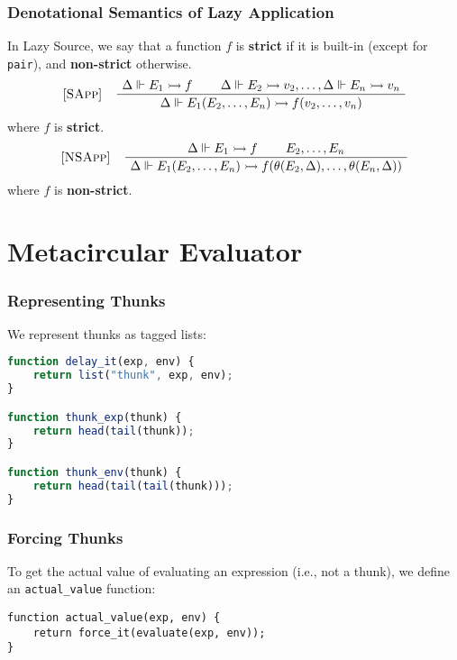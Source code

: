 \documentclass[12pt]{beamer}
\makeatletter
\newenvironment{boxedprooftree}[1][c]
 {\begin{tabular}[#1]{@{}c@{}}}
 {\DisplayProof\end{tabular}}
\makeatother
\begin{document}
\begin{frame}
\frametitle{Denotational Semantics of Lazy Application}
In Lazy Source, we say that a function $f$ is \textbf{strict} if it is built-in (except for \texttt{pair}), and \textbf{non-strict} otherwise.\pause
\[
\begin{tabular}{@{} l c @{}}
[\textsc{SApp}] &
  \begin{boxedprooftree}
  \AxiomC{$\Delta\Vdash E_1\rightarrowtail f$}
  \AxiomC{$\Delta\Vdash E_2\rightarrowtail v_2,\ldots,\Delta\Vdash E_n\rightarrowtail v_n$}
  \BinaryInfC{$\Delta\Vdash E_1(E_2,\ldots,E_n)\rightarrowtail f(v_2,\ldots,v_n)$}
  \end{boxedprooftree}
\end{tabular}
\]
where $f$ is \textbf{strict}.\pause
\[
\begin{tabular}{@{} l c @{}}
[\textsc{NSApp}] &
  \begin{boxedprooftree}
  \AxiomC{$\Delta\Vdash E_1\rightarrowtail f$}
  \AxiomC{$E_2,\ldots,E_n$}
  \BinaryInfC{$\Delta\Vdash E_1(E_2,\ldots,E_n)\rightarrowtail f(\theta(E_2,\Delta),\ldots,\theta(E_n,\Delta))$}
  \end{boxedprooftree}
\end{tabular}
\]
where $f$ is \textbf{non-strict}.
\end{frame}
\section{Metacircular Evaluator}
\begin{frame}[fragile]
\frametitle{Representing Thunks}
We represent thunks as tagged lists:
\begin{lstlisting}[language=JavaScript]
function delay_it(exp, env) {
    return list("thunk", exp, env);
}

function thunk_exp(thunk) {
    return head(tail(thunk));
}

function thunk_env(thunk) {
    return head(tail(tail(thunk)));
}
\end{lstlisting}
\end{frame}

\begin{frame}[fragile]
\frametitle{Forcing Thunks}
To get the actual value of evaluating an expression (i.e., not a thunk), we define an \texttt{actual\_value} function:
\begin{lstlisting}
function actual_value(exp, env) {
    return force_it(evaluate(exp, env));
}
\end{lstlisting}
\end{frame}
\end{document}

